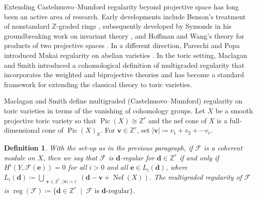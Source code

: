 \documentclass[11pt,reqno]{amsart}
\newtheorem{defn}[lemma]{Definition}
\theoremstyle{remark}
\newcommand{\reg}{\operatorname{reg}}
\newcommand{\Pic}{\operatorname{Pic}}
\newcommand{\Nef}{\operatorname{Nef}}
\newcommand{\dd}{\mathbf{d}}
\newcommand{\ee}{\mathbf{e}}
\newcommand{\vv}{\mathbf{v}}
\newcommand{\RR}{\mathbb{R}}
\newcommand{\ZZ}{\mathbb{Z}}
\newcommand{\cF}{\mathcal{F}}
\begin{document}
Extending Castelnuovo--Mumford regularity beyond projective space has long been an active area of research. Early developments include Benson's treatment of nonstandard $\ZZ$-graded rings \cite{benson04}, subsequently developed by Symonds in his groundbreaking work on invariant theory \cite{symonds10,symonds11}, and Hoffman and Wang's theory for products of two projective spaces \cite{hoffmanWang04}. In a different direction, Pareschi and Popa introduced Mukai regularity on abelian varieties \cite{pareschiPopa03}. In the toric setting, Maclagan and Smith introduced a cohomological definition of multigraded regularity \cite{maclaganSmith04} that incorporates the weighted and biprojective theories and has become a standard framework for extending the classical theory to toric varieties. 

Maclagan and Smith define multigraded (Castelnuovo--Mumford) regularity on toric varieties in terms of the vanishing of cohomology groups. Let $X$ be a smooth projective toric variety so that $\Pic(X)\cong \ZZ^r$ and the nef cone of $X$ is a full-dimensional cone of $\Pic(X)_{\RR}$. For $\vv \in \ZZ^r$, set $|\vv|\coloneqq v_1+v_2+\cdots v_r$. 

\begin{defn}\cite[Definition 6.1]{maclaganSmith04}\label{def:mg-reg}
With the set-up as in the previous paragraph, if $\cF$ is a coherent module on $X$, then we say that $\cF$ is \emph{$\dd$-regular} for $\dd \in \ZZ^r$ if and only if $H^i(Y, \cF(\ee))=0$ for all $i>0$ and all $\ee \in L_{i}(\dd)$, where $L_{i}(\dd) \coloneqq \bigcup_{\substack{\vv\in \ZZ^r, |\vv|=i}} \left(\dd-\vv + \Nef(X)\right)$. The \emph{multigraded regularity} of $\cF$ is $\reg(\cF)\coloneqq \{\dd\in \ZZ^r \;\; | \;\; \text{$\cF$ is $\dd$-regular}\}$. 
\end{defn}
\end{document}
